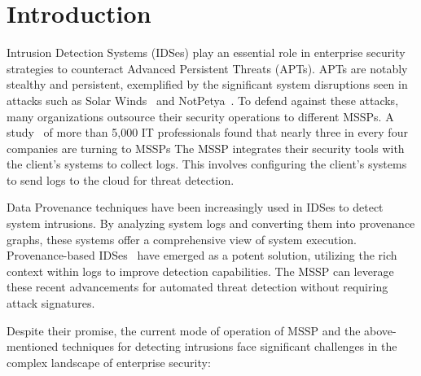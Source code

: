 \section{Introduction}
\label{s:intro}




Intrusion Detection Systems (IDSes) play an essential role in enterprise security strategies to counteract Advanced Persistent Threats (APTs). APTs are notably stealthy and persistent, exemplified by the significant system disruptions seen in attacks such as Solar Winds~\cite{solarwinds} and NotPetya~\cite{notpetya}. To defend against these attacks, many organizations outsource their security operations to different MSSPs. A study~\cite{msspsurvey}  of more than 5,000 IT professionals found that nearly three in every four companies are turning to MSSPs The MSSP integrates their security tools with the client's systems to collect \logs logs. This involves configuring the client’s systems to send \logs logs to the cloud for threat detection. 

Data Provenance techniques have been increasingly used in IDSes to detect system intrusions. By analyzing system logs and converting them into provenance graphs, these systems offer a comprehensive view of system execution. Provenance-based IDSes~\cite{streamspot,provdetector2020,wang2022threatrace,shadewatcher,yangprographer,han2020unicorn} have emerged as a potent solution, utilizing the rich context within \logs logs to improve detection capabilities. The MSSP can leverage these recent advancements for automated threat detection without requiring attack signatures.


Despite their promise, the current mode of operation of MSSP and the above-mentioned techniques for detecting intrusions face significant challenges in the complex landscape of enterprise security:

